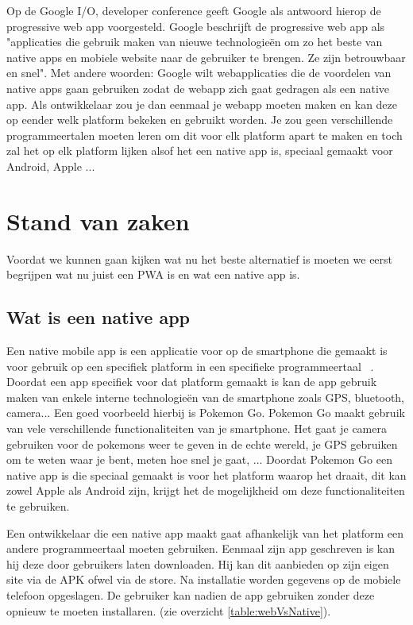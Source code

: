 Op de Google I/O, developer conference geeft Google als antwoord hierop de progressive web app voorgesteld. Google beschrijft de progressive web app als "applicaties die gebruik maken van nieuwe technologieën om zo het beste van native apps en mobiele website naar de gebruiker te brengen. Ze zijn betrouwbaar en snel".
Met andere woorden: Google wilt webapplicaties die de voordelen van native apps gaan gebruiken zodat de webapp zich gaat gedragen als een native app. 
Als ontwikkelaar zou je dan eenmaal je webapp moeten maken en kan deze op eender welk platform bekeken en gebruikt worden. Je zou geen verschillende programmeertalen moeten leren om dit voor elk platform apart te maken en toch zal het op elk platform lijken alsof het een native app is, speciaal gemaakt voor Android, Apple ...






\section{Stand van zaken}
\label{sec:stand-van-zaken}

Voordat we kunnen gaan kijken wat nu het beste alternatief is moeten we eerst begrijpen wat nu juist een PWA is en wat een native app is.

\subsection{Wat is een native app}
Een native mobile app is een applicatie voor op de smartphone die gemaakt is voor gebruik op een specifiek platform in een specifieke programmeertaal ~\autocite{mobileWat}. Doordat een app specifiek voor dat platform gemaakt is kan de app gebruik maken van enkele interne technologieën van de smartphone zoals GPS, bluetooth, camera... Een goed voorbeeld hierbij is Pokemon Go. Pokemon Go maakt gebruik van vele verschillende functionaliteiten van je smartphone. Het gaat je camera gebruiken voor de pokemons weer te geven in de echte wereld, je GPS gebruiken om te weten waar je bent, meten hoe snel je gaat, ...  Doordat Pokemon Go een native app is die speciaal gemaakt is voor het platform waarop het draait, dit kan zowel Apple als Android zijn, krijgt het de mogelijkheid om deze functionaliteiten te gebruiken. 

Een ontwikkelaar die een native app maakt gaat afhankelijk van het platform een andere programmeertaal moeten gebruiken. Eenmaal zijn app geschreven is kan hij deze door gebruikers laten downloaden. Hij kan dit aanbieden op zijn eigen site via de APK ofwel via de store. Na installatie worden gegevens op de mobiele telefoon opgeslagen. De gebruiker kan nadien de app gebruiken zonder deze opnieuw te moeten installaren. (zie overzicht \ref{table:webVsNative}).



